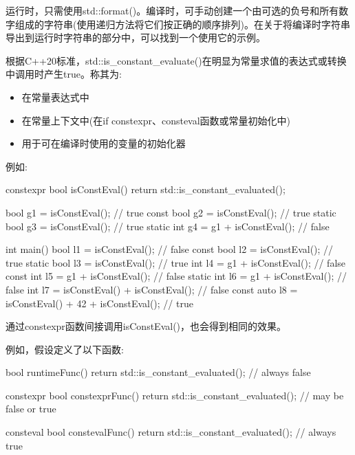 运行时，只需使用std::format()。编译时，可手动创建一个由可选的负号和所有数字组成的字符串(使用递归方法将它们按正确的顺序排列)。在关于将编译时字符串导出到运行时字符串的部分中，可以找到一个使用它的示例。



根据C++20标准，std::is\_constant\_evaluate()在明显为常量求值的表达式或转换中调用时产生true。称其为:

\begin{itemize}
\item
在常量表达式中

\item
在常量上下文中(在if constexpr、consteval函数或常量初始化中)

\item
用于可在编译时使用的变量的初始化器
\end{itemize}

例如:

\begin{cpp}
constexpr bool isConstEval() {
	return std::is_constant_evaluated();
}

bool g1 = isConstEval(); // true
const bool g2 = isConstEval(); // true
static bool g3 = isConstEval(); // true
static int g4 = g1 + isConstEval(); // false

int main()
{
	bool l1 = isConstEval(); // false
	const bool l2 = isConstEval(); // true
	static bool l3 = isConstEval(); // true
	int l4 = g1 + isConstEval(); // false
	const int l5 = g1 + isConstEval(); // false
	static int l6 = g1 + isConstEval(); // false
	int l7 = isConstEval() + isConstEval(); // false
	const auto l8 = isConstEval() + 42 + isConstEval(); // true
}
\end{cpp}

通过constexpr函数间接调用isConstEval()，也会得到相同的效果。


例如，假设定义了以下函数:

\begin{cpp}
bool runtimeFunc() {
	return std::is_constant_evaluated(); // always false
}

constexpr bool constexprFunc() {
	return std::is_constant_evaluated(); // may be false or true
}

consteval bool constevalFunc() {
	return std::is_constant_evaluated(); // always true
}
\end{cpp}

